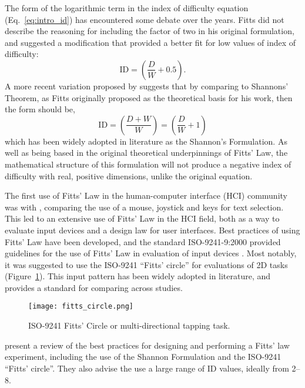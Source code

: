 The form of the logarithmic term in the index of difficulty equation (Eq.\ \ref{eq:intro_id}) has encountered some debate over the years.
Fitts did not describe the reasoning for including the factor of two in his original formulation, and \citet{welford_fundamentals_1968} suggested a modification that provided a better fit for low values of index of difficulty:
\begin{equation}
    \mathrm{ID} = \left( \frac{D}{W} + 0.5 \right).
\end{equation}
A more recent variation proposed by \citet{mackenzie_note_1989} suggests that by comparing to Shannons' Theorem, as Fitts originally proposed as the theoretical basis for his work, then the form should be,
\begin{equation}
    \mathrm{ID} = \left( \frac{D + W}{W} \right) = \left( \frac{D}{W} + 1 \right)
\end{equation}
which has been widely adopted in literature as the Shannon's Formulation.
As well as being based in the original theoretical underpinnings of Fitts' Law, the mathematical structure of this formulation will not produce a negative index of difficulty with real, positive dimensions, unlike the original equation.

The first use of Fitts' Law in the human-computer interface (HCI) community was with \citet{card_evaluation_1978}, comparing the use of a mouse, joystick and keys for text selection.
This led to an extensive use of Fitts' Law in the HCI field, both as a way to evaluate input devices and a design law for user interfaces.
Best practices of using Fitts' Law have been developed, and the standard ISO-9241-9:2000 provided guidelines for the use of Fitts' Law in evaluation of input devices \citep{international_organization_for_standardization_iso_2000}.
Most notably, it was suggested to use the ISO-9241 ``Fitts' circle'' for evaluations of 2D tasks (Figure~\ref{fig:intro_fitts_circle}).
This input pattern has been widely adopted in literature, and provides a standard for comparing across studies.

\begin{figure}
    \centering
    \texttt{[image: fitts\_circle.png]}
    \caption{ISO-9241 Fitts' Circle or multi-directional tapping task.}
    \label{fig:intro_fitts_circle}
\end{figure}

\citet{soukoreff_towards_2004} present a review of the best practices for designing and performing a Fitts' law experiment, including the use of the Shannon Formulation and the ISO-9241 ``Fitts' circle''.
They also advise the use a large range of ID values, ideally from \SIrange{2}{8}{\bits}.

